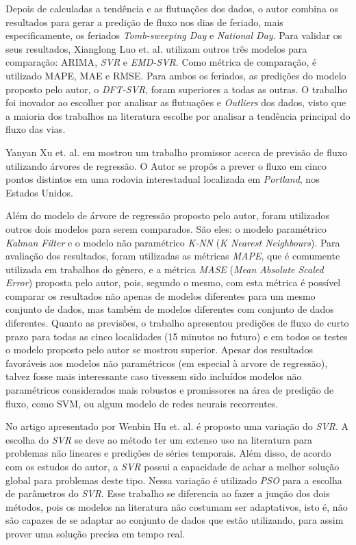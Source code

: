 Depois de calculadas a tendência e as flutuações dos dados, o autor combina os resultados para gerar a predição de fluxo nos dias de feriado, mais especificamente, os feriados \textit{ Tomb-sweeping Day} e \textit{National Day}. Para validar os seus resultados, Xianglong Luo et. al. utilizam outros três modelos para comparação: \acrshort{ARIMA}, \textit{SVR} e \textit{EMD-SVR}. Como métrica de comparação, é utilizado \acrshort{MAPE}, \acrshort{MAE} e \acrshort{RMSE}.  Para ambos os feriados, as predições do modelo proposto pelo autor, o \textit{DFT-SVR}, foram superiores a todas as outras. O trabalho foi inovador ao escolher por analisar as flutuações e \textit{Outliers} dos dados, visto que a maioria dos trabalhos na literatura escolhe por analisar a tendência principal do fluxo das vias.

Yanyan Xu et. al. em \cite{xu2013short} mostrou um trabalho promissor acerca de previsão de fluxo utilizando árvores de regressão. O Autor se propôs a prever o fluxo em cinco pontos distintos em uma rodovia interestadual localizada em \textit{Portland}, nos Estados Unidos.

Além do modelo de árvore de regressão proposto pelo autor, foram utilizados outros dois modelos para serem comparados. São eles: o modelo paramétrico \textit{Kalman Filter} e o modelo não paramétrico \textit{K-NN} (\textit{K Nearest Neighbours}). Para avaliação dos resultados, foram utilizadas as métricas \textit{MAPE}, que é comumente utilizada em trabalhos do gênero, e a métrica \textit{MASE} (\textit{Mean
Absolute Scaled Error}) proposta pelo autor, pois, segundo o mesmo, com esta métrica é possível comparar os resultados não apenas de modelos diferentes para um mesmo conjunto de dados, mas também de modelos diferentes com conjunto de dados diferentes. 
Quanto as previsões, o trabalho apresentou predições de fluxo de curto prazo para todas as cinco localidades (15 minutos no futuro) e em todos os testes o modelo proposto pelo autor se mostrou superior. Apesar dos resultados favoráveis aos modelos não paramétricos (em especial à arvore de regressão), talvez fosse mais interessante caso tivessem sido incluídos modelos não paramétricos considerados mais robustos e promissores na área de predição de fluxo, como \acrshort{SVM}, ou algum modelo de redes neurais recorrentes. 


No artigo \cite{Hu2016} apresentado por Wenbin Hu et. al. é proposto uma variação do \textit{\acrfull{SVR}}. A escolha do \textit{\acrshort{SVR}} se deve ao método ter um extenso uso na literatura para problemas não lineares e predições de séries temporais. Além disso, de acordo com os estudos do autor, a \textit{\acrshort{SVR}} possui a capacidade de achar a melhor solução global para problemas deste tipo. Nessa variação é utilizado \textit{\acrfull{PSO}} para a escolha de parâmetros do \textit{\acrshort{SVR}}. Esse trabalho se diferencia ao fazer a junção dos dois métodos, pois os modelos na literatura não costumam ser adaptativos, isto é, não são capazes de se adaptar ao conjunto de dados que estão utilizando, para assim prover uma solução precisa em tempo real.

